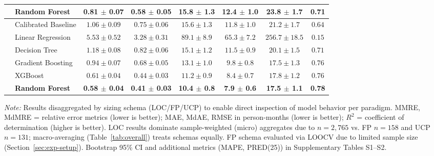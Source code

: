 \documentclass{ieeeaccess}
\begin{document}
\begin{table}[t]
\begin{tabular}{@{}llcccccc@{}}
  & \textbf{Random Forest} & \textbf{0.81 $\pm$ 0.07} & \textbf{0.58 $\pm$ 0.05} & \textbf{15.8 $\pm$ 1.3} & \textbf{12.4 $\pm$ 1.0} & \textbf{23.8 $\pm$ 1.7} & \textbf{0.71} \\
\midrule
{} 
  & Calibrated Baseline & $1.06 \pm 0.09$ & $0.75 \pm 0.06$ & $15.6 \pm 1.3$ & $11.8 \pm 1.0$ & $21.2 \pm 1.7$ & $0.64$ \\
  & Linear Regression & $5.53 \pm 0.52$ & $3.28 \pm 0.31$ & $89.1 \pm 8.9$ & $65.3 \pm 7.2$ & $256.7 \pm 18.5$ & $0.15$ \\
  & Decision Tree & $1.18 \pm 0.08$ & $0.82 \pm 0.06$ & $15.1 \pm 1.2$ & $11.5 \pm 0.9$ & $20.1 \pm 1.5$ & $0.71$ \\
  & Gradient Boosting & $0.94 \pm 0.07$ & $0.68 \pm 0.05$ & $13.1 \pm 1.0$ & $9.8 \pm 0.8$ & $17.5 \pm 1.3$ & $0.76$ \\
  & XGBoost & $0.61 \pm 0.04$ & $0.44 \pm 0.03$ & $11.2 \pm 0.9$ & $8.4 \pm 0.7$ & $17.8 \pm 1.2$ & $0.76$ \\
  & \textbf{Random Forest} & \textbf{0.58 $\pm$ 0.04} & \textbf{0.41 $\pm$ 0.03} & \textbf{10.4 $\pm$ 0.8} & \textbf{7.9 $\pm$ 0.6} & \textbf{17.5 $\pm$ 1.1} & \textbf{0.78} \\
\bottomrule
\end{tabular}
\vspace{0.3em}
\raggedright\footnotesize
\textit{Note:} Results disaggregated by sizing schema (LOC/FP/UCP) to enable direct inspection of model behavior per paradigm. 
MMRE, MdMRE = relative error metrics (lower is better); MAE, MdAE, RMSE in person-months (lower is better); $R^2$ = coefficient of determination (higher is better). 
LOC results dominate sample-weighted (micro) aggregates due to $n{=}2{,}765$ vs. FP $n{=}158$ and UCP $n{=}131$; 
macro-averaging (Table~\ref{tab:overall}) treats schemas equally. 
FP schema evaluated via LOOCV due to limited sample size (Section~\ref{sec:exp-setup}). 
Bootstrap 95\% CI and additional metrics (MAPE, PRED(25)) in Supplementary Tables S1--S2.
\end{table}
\end{document}
